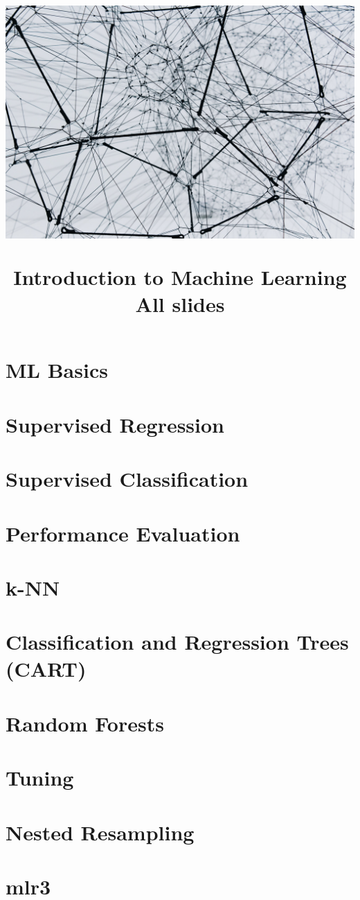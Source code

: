 \documentclass[11pt,compress]{beamer}
\title{
\hspace{-0.5cm}\centerline{\includegraphics[width=1.05\paperwidth,keepaspectratio, trim={0 15cm 0 5cm}, clip]{titlepage.jpg}}
\medskip
Introduction to Machine Learning \\
\medskip
\small All slides
\vspace{-1.5cm}
}
\begin{document}

\begin{frame}
\maketitle
\end{frame}



\section{ML Basics}


\section{Supervised Regression}


\section{Supervised Classification}


\section{Performance Evaluation}


\section{k-NN}


\section{Classification and Regression Trees (CART)}


\section{Random Forests}


\section{Tuning}


\section{Nested Resampling}


\section{mlr3}

\end{document}
